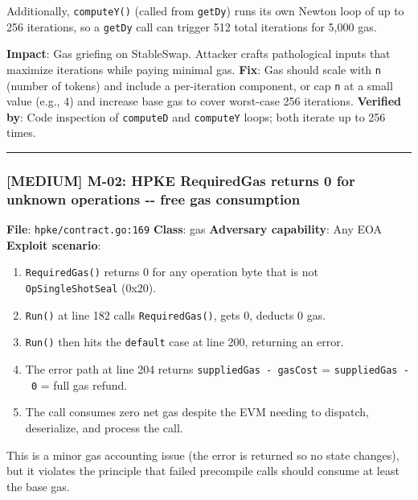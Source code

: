 \documentclass[
]{article}
\providecommand{\tightlist}{%
  \setlength{\itemsep}{0pt}\setlength{\parskip}{0pt}}
\begin{document}
Additionally, \texttt{computeY()} (called from \texttt{getDy}) runs its
own Newton loop of up to 256 iterations, so a \texttt{getDy} call can
trigger 512 total iterations for 5,000 gas.

\textbf{Impact}: Gas griefing on StableSwap. Attacker crafts
pathological inputs that maximize iterations while paying minimal gas.
\textbf{Fix}: Gas should scale with \texttt{n} (number of tokens) and
include a per-iteration component, or cap \texttt{n} at a small value
(e.g., 4) and increase base gas to cover worst-case 256 iterations.
\textbf{Verified by}: Code inspection of \texttt{computeD} and
\texttt{computeY} loops; both iterate up to 256 times.

\begin{center}\rule{0.5\linewidth}{0.5pt}\end{center}

\subsubsection{{[}MEDIUM{]} M-02: HPKE RequiredGas returns 0 for unknown
operations -\/- free gas
consumption}\label{medium-m-02-hpke-requiredgas-returns-0-for-unknown-operations----free-gas-consumption}

\textbf{File}: \texttt{hpke/contract.go:169} \textbf{Class}: gas
\textbf{Adversary capability}: Any EOA \textbf{Exploit scenario}:

\begin{enumerate}
\def\labelenumi{\arabic{enumi}.}
\tightlist
\item
  \texttt{RequiredGas()} returns 0 for any operation byte that is not
  \texttt{OpSingleShotSeal} (0x20).
\item
  \texttt{Run()} at line 182 calls \texttt{RequiredGas()}, gets 0,
  deducts 0 gas.
\item
  \texttt{Run()} then hits the \texttt{default} case at line 200,
  returning an error.
\item
  The error path at line 204 returns \texttt{suppliedGas\ -\ gasCost} =
  \texttt{suppliedGas\ -\ 0} = full gas refund.
\item
  The call consumes zero net gas despite the EVM needing to dispatch,
  deserialize, and process the call.
\end{enumerate}

This is a minor gas accounting issue (the error is returned so no state
changes), but it violates the principle that failed precompile calls
should consume at least the base gas.
\end{document}
